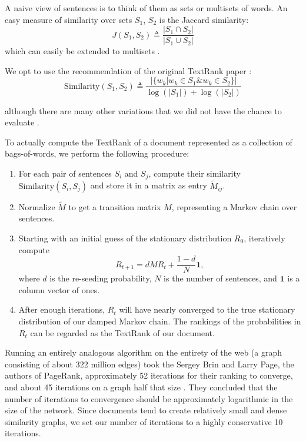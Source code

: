 A naive view of sentences is to think of them as sets or multisets of words.
An easy measure of similarity over sets $S_1$, $S_2$ is the Jaccard similarity:
\begin{equation*}
  J(S_1, S_2) \triangleq \frac{|S_1 \cap S_2|}{|S_1 \cup S_2|}
\end{equation*}
which can easily be extended to multisets \cite{wiki:Multiset}.

We opt to use the recommendation of the original TextRank paper \cite{textrank}:
\begin{equation*}
  \text{Similarity}(S_1, S_2) \triangleq \frac{ | \{ w_k | w_k \in S_1 \& w_k \in S_2 \} |}{\log(|S_1|) + \log(|S_2|)}
\end{equation*}

although there are many other variations that we did not have the chance to evaluate \cite{textrank-sim-var}.

To actually compute the TextRank of a document represented as a collection of bags-of-words, we perform the following procedure:
\singlespacing
\begin{enumerate}
\item For each pair of sentences $S_i$ and $S_j$, compute their similarity $\text{Similarity}(S_i, S_j)$ and store it in a matrix as entry $\tilde{M}_{ij}$.
\item Normalize $\tilde{M}$ to get a transition matrix $M$, representing a Markov chain over sentences.
\item Starting with an initial guess of the stationary distribution $R_0$, iteratively compute 
  \[
    R_{t+1} = dMR_t + \frac{1-d}{N} \mathbf{1},
  \]
where $d$ is the re-seeding probability, $N$ is the number of sentences, and $\mathbf{1}$ is a column vector of ones.
\item After enough iterations, $R_t$ will have nearly converged to the true stationary distribution of our damped Markov chain. The rankings of the probabilities in $R_t$ can be regarded as the TextRank of our document.
\end{enumerate}
\doublespacing
Running an entirely analogous algorithm on the entirety of the web (a graph consisting of about 322 million edges) took the Sergey Brin and Larry Page, the authors of PageRank, approximately 52 iterations for their ranking to converge, and about 45 iterations on a graph half that size \cite{wiki:PageRank}. 
They concluded that the number of iterations to convergence should be approximately logarithmic in the size of the network.
Since documents tend to create relatively small and dense similarity graphs, we set our number of iterations to a highly conservative 10 iterations.
